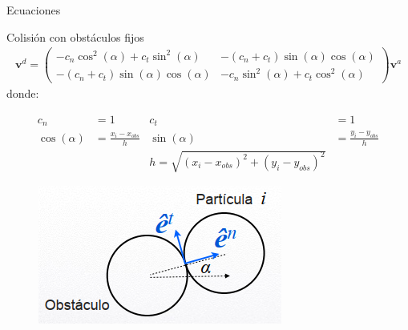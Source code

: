 \begin{frame}{Ecuaciones}
    \begin{block}{Colisión con obstáculos fijos}
        \begin{equation*}
            \begin{aligned}
                \mathbf{v}^{d} = \begin{pmatrix} -c_n \cos^{2}(\alpha) + c_t \sin^{2}(\alpha) & - (c_n + c_t) \sin(\alpha) \cos(\alpha) \\
                - (c_n + c_t) \sin(\alpha) \cos(\alpha) & -c_n \sin^{2}(\alpha) + c_t \cos^{2}(\alpha) \end{pmatrix} \mathbf{v}^{a}
            \end{aligned}\label{eq:equation-particles-collision-obstacle}
        \end{equation*}
        donde:
        \begin{minipage}[t]{0.5\linewidth}
            \begin{equation*}
                \begin{aligned}
                    c_n &= 1 &
                    c_t &= 1 \\
                    \cos(\alpha) &= \frac{x_i - x_{obs}}{h} &
                    \sin(\alpha) &= \frac{y_i - y_{obs}}{h} \\&&
                    h = \sqrt{(x_i - x_{obs})^2 + (y_i - y_{obs})^2}
                \end{aligned}\label{eq:equation-particles-collision-obstacle-variables}
            \end{equation*}
        \end{minipage}
        \hfill
        \begin{minipage}[t]{0.2\linewidth}
            \begin{figure}[H]
                \centering
                \includegraphics[width=1\linewidth]{pic/01-intro/obstacle-collision-diagram}\label{fig:figure-obstacle-collision-diagram}
            \end{figure}
        \end{minipage}
    \end{block}

\end{frame}
